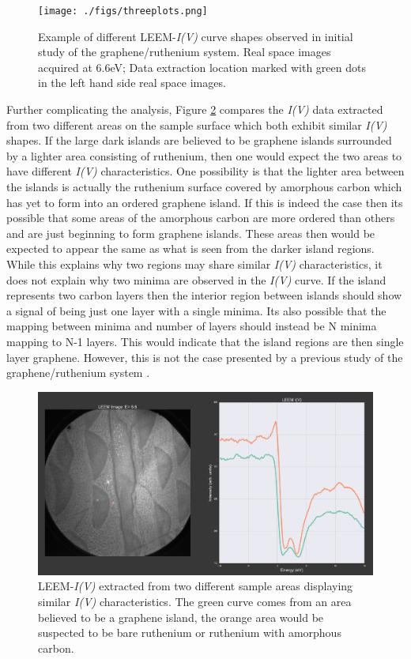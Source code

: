 \begin{figure}
  \centering
  \texttt{[image: ./figs/threeplots.png]}
  \caption{Example of different LEEM-\textit{I(V)} curve shapes observed in initial study of the graphene/ruthenium system. Real space images acquired at 6.6eV; Data extraction location marked with green dots in the left hand side real space images.}
  \label{fig:LEEM-curves}
\end{figure}

Further complicating the analysis, Figure \ref{fig:2dips-2locations} compares the \textit{I(V)} data extracted from two different areas on the sample surface which both exhibit similar \textit{I(V)} shapes. If the large dark islands are believed to be graphene islands surrounded by a lighter area consisting of ruthenium, then one would expect the two areas to have different \textit{I(V)} characteristics. One possibility is that the lighter area between the islands is actually the ruthenium surface covered by amorphous carbon which has yet to form into an ordered graphene island. If this is indeed the case then its possible that some areas of the amorphous carbon are more ordered than others and are just beginning to form graphene islands. These areas then would be expected to appear the same as what is seen from the darker island regions. While this explains why two regions may share similar \textit{I(V)} characteristics, it does not explain why two minima are observed in the \textit{I(V)} curve. If the island represents two carbon layers then the interior region between islands should show a signal of being just one layer with a single minima. Its also possible that the mapping between minima and number of layers should instead be N minima mapping to N-1 layers. This would indicate that the island regions are then single layer graphene. However, this is not the case presented by a previous study of the graphene/ruthenium system \cite{sutterleem}.


\begin{figure}
  \centering
  \includegraphics[scale=0.23]{./figs/2dips-2locations.png}
  \caption{LEEM-\textit{I(V)} extracted from two different sample areas displaying similar \textit{I(V)} characteristics. The green curve comes from an area believed to be a graphene island, the orange area would be suspected to be bare ruthenium or ruthenium with amorphous carbon.}
  \label{fig:2dips-2locations}
\end{figure}

